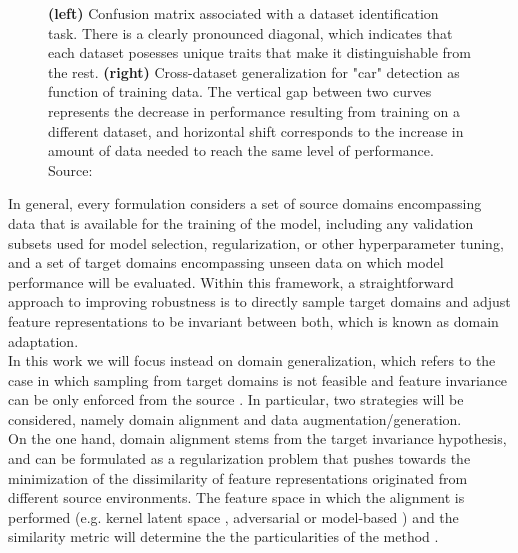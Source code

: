 \begin{figure}[H]
\begin{subfigure}[b]{0.32\textwidth}
    \end{subfigure}
       \caption{
        \textbf{(left)} Confusion matrix associated with a dataset
        identification task. There is a clearly pronounced diagonal,
        which indicates that each dataset posesses unique traits that
        make it distinguishable from the rest.
        \textbf{(right)} Cross-dataset generalization
        for "car" detection as function of training data. The vertical 
        gap between two curves represents the decrease in performance 
        resulting from training on a different dataset, and horizontal 
        shift corresponds to the increase in amount of data needed 
        to reach the same level of performance.
        Source: \cite{torralbaUnbiasedLookDataset2011}}
       \label{fig:dataset_bias}
\end{figure}

In general, every formulation considers a set of source domains 
encompassing data that is available for the training of the model,
including any validation subsets used for model selection, 
regularization, or other hyperparameter tuning, and a set of target 
domains encompassing unseen data on which model performance will
be evaluated. Within this framework, a straightforward approach
to improving robustness is to directly sample target domains
and adjust feature representations to be invariant 
between both, which is known as domain adaptation. \\

In this work we will focus instead on domain generalization, which 
refers to the case in which sampling from target domains is 
not feasible and feature invariance can be only enforced 
from the source
\cite{blanchardGeneralizingSeveralRelated}. In particular, two strategies will be considered, 
namely domain alignment and data augmentation/generation. \\

On the one hand, domain alignment stems from the target invariance hypothesis, 
and can be formulated as a regularization problem that pushes towards the 
minimization of the dissimilarity of feature  representations originated 
from different source environments. The feature space in which the 
alignment is performed (e.g. kernel latent space 
\cite{muandetDomainGeneralizationInvariant2013}, 
adversarial
\cite{peiMultiAdversarialDomainAdaptation}
or model-based
\cite{arjovskyInvariantRiskMinimization2020}) 
and the similarity metric will
determine the the particularities of the method
\cite{shenWassersteinDistanceGuided2018,liangComprehensiveSurveyTestTime2023}.


